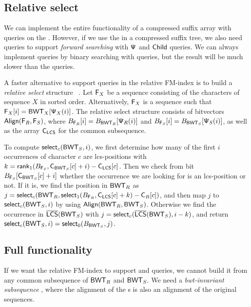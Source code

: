\subsection{Relative select}

We can implement the entire functionality of a compressed suffix array with
\rank{} queries on the \BWT. However, if we use the \CSA{} in a compressed
suffix tree, we also need \select{} queries to support \emph{forward
searching} with $\mathsf{\Psi}$ and $\mathsf{Child}$ queries. We can always implement
\select{} queries by binary searching with \rank{} queries, but the result
will be much slower than the \rank{} queries.

A faster alternative to support \select{} queries in the relative FM-index
is to build a \emph{relative select} structure \rselect{}~\cite{Boucher2015}.
Let $\mathsf{F}_{X}$ be a sequence consisting of the characters of sequence $X$ in
sorted order. Alternatively, $\mathsf{F}_{X}$ is a sequence such that $\mathsf{F}_{X}[i] =
\mathsf{BWT}_{X}[\mathsf{\Psi}_X(i)]$. The relative select structure consists of bitvectors
$\mathsf{Align}(\mathsf{F}_{R}, \mathsf{F}_{S})$, where $B_{\mathsf{F}_{R}}[i] = B_{\mathsf{BWT}_{R}}[\mathsf{\Psi}_R(i)]$ 
and $B_{\mathsf{F}_{S}}[i] = B_{\mathsf{BWT}_{S}}[\mathsf{\Psi}_S(i)]$, as well as the \C{} array
$\mathsf{C}_{\mathsf{LCS}}$ for the common subsequence.

To compute $\mathsf{select}_{c}(\mathsf{BWT}_{S}, i)$, we first determine how many of
the first $i$ occurrences of character $c$ are lcs-positions with $k =
\mathsf{rank}_{1}(B_{\mathsf{F}_{S}}, \mathsf{C}_{\mathsf{BWT}_{S}}[c] + i) - \mathsf{C}_{\mathsf{LCS}}[c]$. Then we check
from bit $B_{\mathsf{F}_{S}}[\mathsf{C}_{\mathsf{BWT}_{S}}[c] + i]$ whether the occurrence we are
looking for is an lcs-position or not. If it is,
we find the position in $\mathsf{BWT}_{R}$ as $j = \mathsf{select}_{c}(\mathsf{BWT}_{R},
\mathsf{select}_{1}(B_{\mathsf{F}_{R}}, \mathsf{C}_{\mathsf{LCS}}[c] + k)- \mathsf{C}_{R}[c])$, and then map $j$ to
$\mathsf{select}_{c}(\mathsf{BWT}_{S}, i)$ by using $\mathsf{Align}(\mathsf{BWT}_{R}, \mathsf{BWT}_{S})$. Otherwise we
find the occurrence in $\overline{ \mathsf{LCS} }(\mathsf{BWT}_{S})$ with $j = \mathsf{select}_{c}(\overline{ \mathsf{LCS} }(\mathsf{BWT}_{S}),
i-k)$, and return $\mathsf{select}_{c}(\mathsf{BWT}_{S}, i) = \mathsf{select}_{0}(B_{\mathsf{BWT}_{S}}, j)$.

\subsection{Full functionality}

If we want the relative FM-index to support \locate{} and \extract{} queries,
we cannot build it from any common subsequence of $\mathsf{BWT}_{R}$ and $\mathsf{BWT}_{S}$.
We need a \emph{bwt-invariant subsequence} \cite{Belazzougui2014}, where the
alignment of the \BWT{}s is also an alignment of the original sequences.

